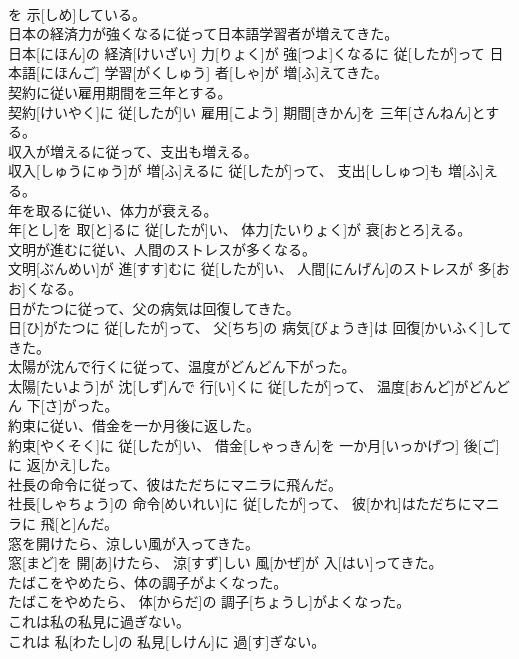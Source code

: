 \documentclass[8pt]{extreport}
\begin{document}
\begin{CJK}{UTF8}{min}
\\	を 示[しめ]している。
\\	日本の経済力が強くなるに従って日本語学習者が増えてきた。	
\\	日本[にほん]の 経済[けいざい] 力[りょく]が 強[つよ]くなるに 従[したが]って 日本語[にほんご] 学習[がくしゅう] 者[しゃ]が 増[ふ]えてきた。
\\	契約に従い雇用期間を三年とする。	
\\	契約[けいやく]に 従[したが]い 雇用[こよう] 期間[きかん]を 三年[さんねん]とする。
\\	収入が増えるに従って、支出も増える。	
\\	収入[しゅうにゅう]が 増[ふ]えるに 従[したが]って、 支出[ししゅつ]も 増[ふ]える。
\\	年を取るに従い、体力が衰える。	
\\	年[とし]を 取[と]るに 従[したが]い、 体力[たいりょく]が 衰[おとろ]える。
\\	文明が進むに従い、人間のストレスが多くなる。	
\\	文明[ぶんめい]が 進[すす]むに 従[したが]い、 人間[にんげん]のストレスが 多[おお]くなる。
\\	日がたつに従って、父の病気は回復してきた。	
\\	日[ひ]がたつに 従[したが]って、 父[ちち]の 病気[びょうき]は 回復[かいふく]してきた。
\\	太陽が沈んで行くに従って、温度がどんどん下がった。	
\\	太陽[たいよう]が 沈[しず]んで 行[い]くに 従[したが]って、 温度[おんど]がどんどん 下[さ]がった。
\\	約束に従い、借金を一か月後に返した。	
\\	約束[やくそく]に 従[したが]い、 借金[しゃっきん]を 一か月[いっかげつ] 後[ご]に 返[かえ]した。
\\	社長の命令に従って、彼はただちにマニラに飛んだ。	
\\	社長[しゃちょう]の 命令[めいれい]に 従[したが]って、 彼[かれ]はただちにマニラに 飛[と]んだ。
\\	窓を開けたら、涼しい風が入ってきた。	
\\	窓[まど]を 開[あ]けたら、 涼[すず]しい 風[かぜ]が 入[はい]ってきた。
\\	たばこをやめたら、体の調子がよくなった。	
\\	たばこをやめたら、 体[からだ]の 調子[ちょうし]がよくなった。
\\	これは私の私見に過ぎない。	
\\	これは 私[わたし]の 私見[しけん]に 過[す]ぎない。

\end{CJK}
\end{document}
